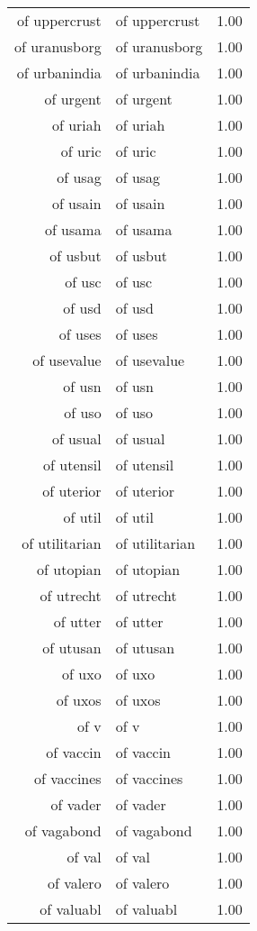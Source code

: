 \begin{table}[ht]
\begin{tabular}{rlr}
  of uppercrust & of uppercrust & 1.00 \\ 
  of uranusborg & of uranusborg & 1.00 \\ 
  of urbanindia & of urbanindia & 1.00 \\ 
  of urgent & of urgent & 1.00 \\ 
  of uriah & of uriah & 1.00 \\ 
  of uric & of uric & 1.00 \\ 
  of usag & of usag & 1.00 \\ 
  of usain & of usain & 1.00 \\ 
  of usama & of usama & 1.00 \\ 
  of usbut & of usbut & 1.00 \\ 
  of usc & of usc & 1.00 \\ 
  of usd & of usd & 1.00 \\ 
  of uses & of uses & 1.00 \\ 
  of usevalue & of usevalue & 1.00 \\ 
  of usn & of usn & 1.00 \\ 
  of uso & of uso & 1.00 \\ 
  of usual & of usual & 1.00 \\ 
  of utensil & of utensil & 1.00 \\ 
  of uterior & of uterior & 1.00 \\ 
  of util & of util & 1.00 \\ 
  of utilitarian & of utilitarian & 1.00 \\ 
  of utopian & of utopian & 1.00 \\ 
  of utrecht & of utrecht & 1.00 \\ 
  of utter & of utter & 1.00 \\ 
  of utusan & of utusan & 1.00 \\ 
  of uxo & of uxo & 1.00 \\ 
  of uxos & of uxos & 1.00 \\ 
  of v & of v & 1.00 \\ 
  of vaccin & of vaccin & 1.00 \\ 
  of vaccines & of vaccines & 1.00 \\ 
  of vader & of vader & 1.00 \\ 
  of vagabond & of vagabond & 1.00 \\ 
  of val & of val & 1.00 \\ 
  of valero & of valero & 1.00 \\ 
  of valuabl & of valuabl & 1.00 \\ 

\end{tabular}
\end{table}
